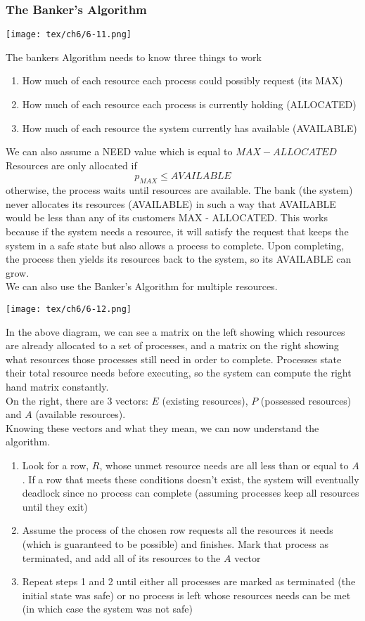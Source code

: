 \documentclass{article}
\begin{document}
\subsubsection*{The Banker's Algorithm}
\begin{center}
\texttt{[image: tex/ch6/6-11.png]}
\end{center}
The bankers Algorithm needs to know three things to work
\begin{enumerate}
	\item How much of each resource each process could possibly request (its MAX)
	\item How much of each resource each process is currently holding (ALLOCATED)
	\item How much of each resource the system currently has available (AVAILABLE)
\end{enumerate}
We can also assume a NEED value which is equal to $MAX - ALLOCATED$
\\Resources are only allocated if 
$$p_{MAX} \leq AVAILABLE$$
otherwise, the process waits until resources are available. The bank (the system) never allocates its resources (AVAILABLE) in such a way that AVAILABLE would be less than any of its customers MAX - ALLOCATED. This works because if the system needs a resource, it will satisfy the request that keeps the system in a safe state but also allows a process to complete. Upon completing, the process then yields its resources back to the system, so its AVAILABLE can grow.
\\We can also use the Banker's Algorithm for multiple resources.
\begin{center}
\texttt{[image: tex/ch6/6-12.png]}
\end{center}
In the above diagram, we can see a matrix on the left showing which resources are already allocated to a set of processes, and a matrix on the right showing what resources those processes still need in order to complete. Processes state their total resource needs before executing, so the system can compute the right hand matrix constantly.
\\On the right, there are 3 vectors: $E$ (existing resources), $P$ (possessed resources) and $A$ (available resources).
\\Knowing these vectors and what they mean, we can now understand the algorithm.
\begin{enumerate}
	\item Look for a row, $R$, whose unmet resource needs are all less than or equal to $A$. If a row that meets these conditions doesn't exist, the system will eventually deadlock since no process can complete (assuming processes keep all resources until they exit)
	\item Assume the process of the chosen row requests all the resources it needs (which is guaranteed to be possible) and finishes. Mark that process as terminated, and add all of its resources to the $A$ vector
	\item Repeat steps 1 and 2 until either all processes are marked as terminated (the initial state was safe) or no process is left whose resources needs can be met (in which case the system was not safe)
\end{enumerate}
\end{document}
